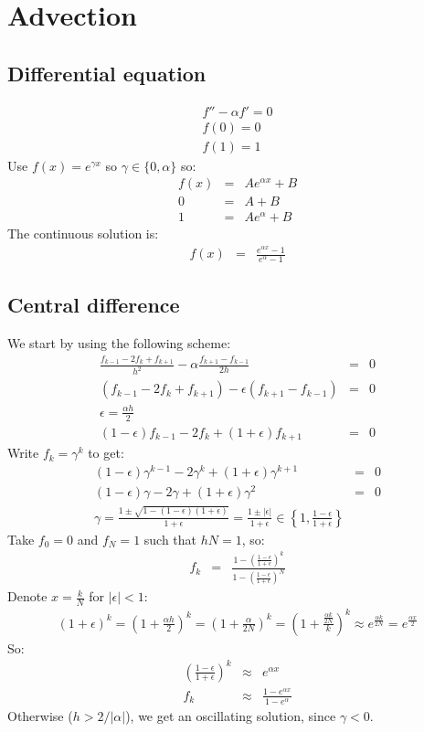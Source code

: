 \documentclass[11pt]{article}
\newcommand\eps \epsilon
\begin{document}
\section{Advection}
\subsection{Differential equation}
\begin{eqnarray}
  f'' - \alpha f' = 0 \\
  f(0) = 0 \\ f(1) = 1
\end{eqnarray}
Use $f(x) = e^{\gamma x}$ so $\gamma \in \{0, \alpha\}$ so:
\begin{eqnarray}
  f(x) &=& Ae^{\alpha x} + B \\
  0 &=& A + B \\
  1 &=& Ae^{\alpha} + B 
\end{eqnarray}
The continuous solution is:
\begin{eqnarray}
  f(x) &=& \frac{e^{\alpha x} - 1}{e^{\alpha} - 1}
\end{eqnarray}
\subsection{Central difference}
We start by using the following scheme:
\begin{eqnarray}
  \frac{f_{k-1}-2f_k+f_{k+1}}{h^2}
  - \alpha \frac{f_{k+1}-f_{k-1}}{2h} &=& 0 \\
(f_{k-1}-2f_k+f_{k+1}) - \eps (f_{k+1}-f_{k-1}) &=& 0 \\
\eps = \frac{\alpha h}{2} \\
(1-\eps)f_{k-1}-2f_k+(1+\eps)f_{k+1} &=& 0
\end{eqnarray}
Write $f_k = \gamma^k$ to get:
\begin{eqnarray}
  (1-\eps)\gamma^{k-1} - 2\gamma^k + (1+\eps)\gamma^{k+1}&=& 0 \\
  (1-\eps)\gamma - 2\gamma + (1+\eps)\gamma^2&=& 0 \\
  \gamma = \frac{1 \pm \sqrt{1 - (1-\eps)(1+\eps)}}{1+\eps}
         = \frac{1 \pm |\eps|}{1+\eps} \in 
           \left\{1, \frac{1- \eps}{1+\eps}\right\} 
\end{eqnarray}
Take $f_0 = 0$ and $f_N = 1$ such that $h N = 1$, so:
\begin{eqnarray}
  f_k &=& \frac{1 - \left(\frac{1- \eps}{1+\eps}\right)^k}
  {1 - \left(\frac{1- \eps}{1+\eps}\right)^N}
\end{eqnarray}  
Denote $x = \frac{k}{N}$ for $|\eps| < 1$:
\begin{eqnarray}
(1+\eps)^k = \left(1+\frac{\alpha h}{2}\right)^k = 
\left(1+\frac{\alpha}{2N}\right)^k = 
\left(1+\frac{\frac{\alpha k}{2N}}{k}\right)^k \approx
e^{\frac{\alpha k}{2N}} = e^{\frac{\alpha x}{2}} 
\end{eqnarray}
So:
\begin{eqnarray}
  \left(\frac{1- \eps}{1+\eps}\right)^k &\approx& e^{\alpha x} \\
  f_k &\approx& \frac{1 - e^{\alpha x}}{1 - e^{\alpha}}   
\end{eqnarray}
Otherwise ($h > 2/|\alpha|$), we get an oscillating solution, since $\gamma < 0$.
\end{document}
